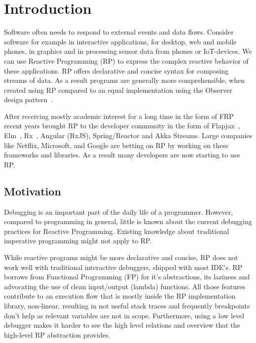 \section{Introduction}
Software often needs to respond to external events and data flows. Consider software for example in interactive applications, for desktop, web and mobile phones, in graphics and in processing sensor data from phones or IoT-devices. We can use Reactive Programming (RP) to express the complex reactive behavior of these applications. RP offers declarative and concise syntax for composing streams of data. As a result programs are generally more comprehensible, when created using RP compared to an equal implementation using the Observer design pattern~\cite{johnson1995design, salvaneschi2014empirical}.

After receiving mostly academic interest for a long time in the form of FRP~\cite{elliott1997functional,elliott2009push,czaplicki2013asynchronous,maier2010deprecating} recent years brought RP to the developer community in the form of Flapjax~\cite{meyerovich2009flapjax}, Elm~\cite{czaplicki2012elm}, Rx~\cite{meijer2010subject}, Angular (RxJS), Spring/Reactor and Akka Streams. Large companies like Netflix, Microsoft, and Google are betting on RP by working on these frameworks and libraries. As a result many developers are now starting to use RP.



\subsection{Motivation}
Debugging is an important part of the daily life of a programmer. However, compared to programming in general, little is known about the current debugging practices for Reactive Programming. Existing knowledge about traditional imperative programming might not apply to RP.

While reactive programs might be more declarative and concise, RP does not work well with traditional interactive debuggers, shipped with most IDE's. RP borrows from Functional Programming (FP) for it's abstractions, its laziness and advocating the use of clean input/output (lambda) functions. All those features contribute to an execution flow that is mostly inside the RP implementation library, non-linear, resulting in not useful stack traces and frequently breakpoints don't help as relevant variables are not in scope. Furthermore, using a low level debugger makes it harder to see the high level relations and overview that the high-level RP abstraction provides. 

